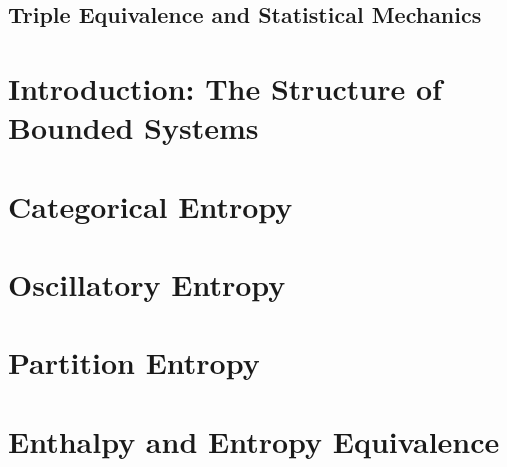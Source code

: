 
\subsection{Triple Equivalence and Statistical Mechanics}
\label{part:thermodynamics}

\section{Introduction: The Structure of Bounded Systems}
\label{sec:introduction_bounded}



\section{Categorical Entropy}
\label{sec:categorical_entropy}



\section{Oscillatory Entropy}
\label{sec:oscillatory_entropy}



\section{Partition Entropy}
\label{sec:partition_entropy}



\section{Enthalpy and Entropy Equivalence}
\label{sec:enthalpy}




